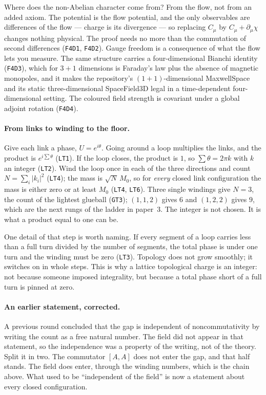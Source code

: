 \documentclass[aps,prd,preprint,superscriptaddress,amsmath,amssymb]{revtex4-2}
\begin{document}
Where does the non-Abelian character come from?  From the flow, not from an
added axiom.  The potential is the flow potential, and the only observables
are differences of the flow --- charge is its divergence --- so replacing
$C_\mu$ by $C_\mu+\partial_\mu\chi$ changes nothing physical.  The proof needs
no more than the commutation of second differences (\texttt{F4D1},
\texttt{F4D2}).  Gauge freedom is a consequence of what the flow lets you
measure.  The same structure carries a four-dimensional Bianchi identity
(\texttt{F4D3}), which for $3+1$ dimensions is Faraday's law plus the absence
of magnetic monopoles, and it makes the repository's $(1+1)$-dimensional
MaxwellSpace and its static three-dimensional SpaceField3D legal in a
time-dependent four-dimensional setting.  The coloured field strength is
covariant under a global adjoint rotation (\texttt{F4D4}).

\paragraph{From links to winding to the floor.}
Give each link a phase, $U=e^{i\theta}$.  Going around a loop multiplies the
links, and the product is $e^{i\sum\theta}$ (\texttt{LT1}).  If the loop
closes, the product is $1$, so $\sum\theta=2\pi k$ with $k$ an integer
(\texttt{LT2}).  Wind the loop once in each of the three directions and count
$N=\sum_i|k_i|^2$ (\texttt{LT4}); the mass is $\sqrt{N}\,M_0$, so for
\emph{every} closed link configuration the mass is either zero or at least
$M_0$ (\texttt{LT4}, \texttt{LT6}).  Three single windings give $N=3$, the
count of the lightest glueball (\texttt{GT3}); $(1,1,2)$ gives $6$ and
$(1,2,2)$ gives $9$, which are the next rungs of the ladder in paper~3.  The
integer is not chosen.  It is what a product equal to one can be.

One detail of that step is worth naming.  If every segment of a loop carries
less than a full turn divided by the number of segments, the total phase is
under one turn and the winding must be zero (\texttt{LT3}).  Topology does not
grow smoothly; it switches on in whole steps.  This is why a lattice
topological charge is an integer: not because someone imposed integrality, but
because a total phase short of a full turn is pinned at zero.

\paragraph{An earlier statement, corrected.}
A previous round concluded that the gap is independent of noncommutativity by
writing the count as a free natural number.  The field did not appear in that
statement, so the independence was a property of the writing, not of the
theory.  Split it in two.  The commutator $[A,A]$ does not enter the gap, and
that half stands.  The field does enter, through the winding numbers, which is
the chain above.  What used to be ``independent of the field'' is now a
statement about every closed configuration.
\end{document}
